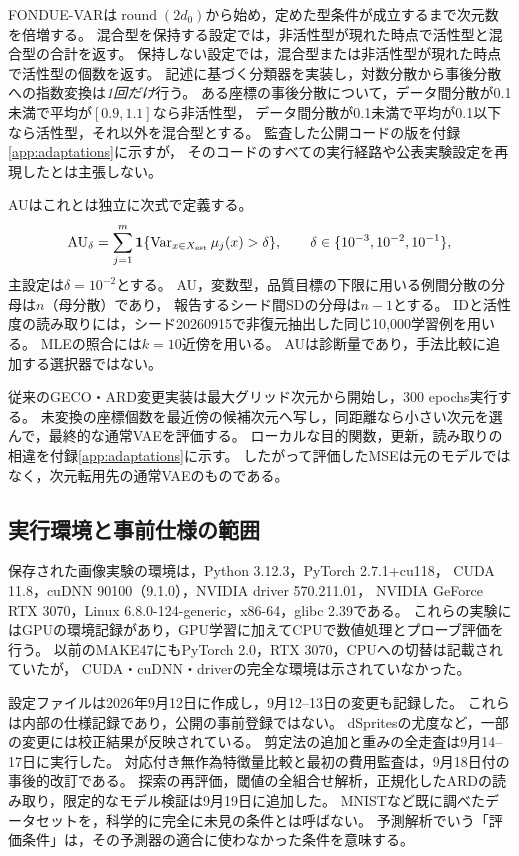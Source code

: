 \documentclass[11pt,a4paper]{ltjsarticle}
\begin{document}
FONDUE-VARは$\operatorname{round}(2d_0)$から始め，定めた型条件が成立するまで次元数を倍増する。
混合型を保持する設定では，非活性型が現れた時点で活性型と混合型の合計を返す。
保持しない設定では，混合型または非活性型が現れた時点で活性型の個数を返す。
記述に基づく分類器を実装し，対数分散から事後分散への指数変換は\emph{1回だけ}行う。
ある座標の事後分散について，データ間分散が0.1未満で平均が$[0.9,1.1]$なら非活性型，
データ間分散が0.1未満で平均が0.1以下なら活性型，それ以外を混合型とする。
監査した公開コードの版を付録\ref{app:adaptations}に示すが，
そのコードのすべての実行経路や公表実験設定を再現したとは主張しない。

AUはこれとは独立に次式で定義する。
\begin{equation}
 \mathrm{AU}_\delta=\sum_{j=1}^{m}
 \mathbf1\{\operatorname{Var}_{x\in X_{\rm est}}\mu_j(x)>\delta\},
 \qquad \delta\in\{10^{-3},10^{-2},10^{-1}\},
 \label{eq:au}
\end{equation}
主設定は$\delta=10^{-2}$とする。
AU，変数型，品質目標の下限に用いる例間分散の分母は$n$（母分散）であり，
報告するシード間SDの分母は$n-1$とする。
IDと活性度の読み取りには，シード20260915で非復元抽出した同じ10,000学習例を用いる。
MLEの照合には$k=10$近傍を用いる。
AUは診断量であり，手法比較に追加する選択器ではない。

従来のGECO・ARD変更実装は最大グリッド次元から開始し，300 epochs実行する。
未変換の座標個数を最近傍の候補次元へ写し，同距離なら小さい次元を選んで，最終的な通常VAEを評価する。
ローカルな目的関数，更新，読み取りの相違を付録\ref{app:adaptations}に示す。
したがって評価したMSEは元のモデルではなく，次元転用先の通常VAEのものである。

\subsection{実行環境と事前仕様の範囲}\label{sec:provenance}
保存された画像実験の環境は，Python 3.12.3，PyTorch 2.7.1+cu118，
CUDA 11.8，cuDNN 90100（9.1.0），NVIDIA driver 570.211.01，
NVIDIA GeForce RTX 3070，Linux 6.8.0-124-generic，x86-64，glibc 2.39である。
これらの実験にはGPUの環境記録があり，GPU学習に加えてCPUで数値処理とプローブ評価を行う。
以前のMAKE47にもPyTorch 2.0，RTX 3070，CPUへの切替は記載されていたが，
CUDA・cuDNN・driverの完全な環境は示されていなかった。

設定ファイルは2026年9月12日に作成し，9月12--13日の変更も記録した。
これらは内部の仕様記録であり，公開の事前登録ではない。
dSpritesの尤度など，一部の変更には校正結果が反映されている。
剪定法の追加と重みの全走査は9月14--17日に実行した。
対応付き無作為特徴量比較と最初の費用監査は，9月18日付の事後的改訂である。
探索の再評価，閾値の全組合せ解析，正規化したARDの読み取り，限定的なモデル検証は9月19日に追加した。
MNISTなど既に調べたデータセットを，科学的に完全に未見の条件とは呼ばない。
予測解析でいう「評価条件」は，その予測器の適合に使わなかった条件を意味する。
\end{document}
